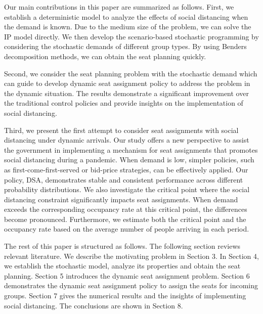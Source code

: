 

Our main contributions in this paper are summarized as follows. First, we establish a deterministic model to analyze the effects of social distancing when the demand is known. Due to the medium size of the problem, we can solve the IP model directly. We then develop the scenario-based stochastic programming by considering the stochastic demands of different group types. By using Benders decomposition methods, we can obtain the seat planning quickly. 

Second, we consider the seat planning problem with the stochastic demand which can guide to develop dynamic seat assignment policy to address the problem in the dynamic situation. The results demonstrate a significant improvement over the traditional control policies and provide insights on the implementation of social distancing.

Third, we present the first attempt to consider seat assignments with social distancing under dynamic arrivals. Our study offers a new perspective to assist the government in implementing a mechanism for seat assignments that promotes social distancing during a pandemic. When demand is low, simpler policies, such as first-come-first-served or bid-price strategies, can be effectively applied.
Our policy, DSA, demonstrates stable and consistent performance across different probability distributions. We also investigate the critical point where the social distancing constraint significantly impacts seat assignments. When demand exceeds the corresponding occupancy rate at this critical point, the differences become pronounced. Furthermore, we estimate both the critical point and the occupancy rate based on the average number of people arriving in each period.


The rest of this paper is structured as follows. The following section reviews relevant literature. We describe the motivating problem in Section 3. In Section 4, we establish the stochastic model, analyze its properties and obtain the seat planning. Section 5 introduces the dynamic seat assignment problem.
Section 6 demonstrates the dynamic seat assignment policy to assign the seats for incoming groups. Section 7 gives the numerical results and the insights of implementing social distancing. The conclusions are shown in Section 8.
\newpage

